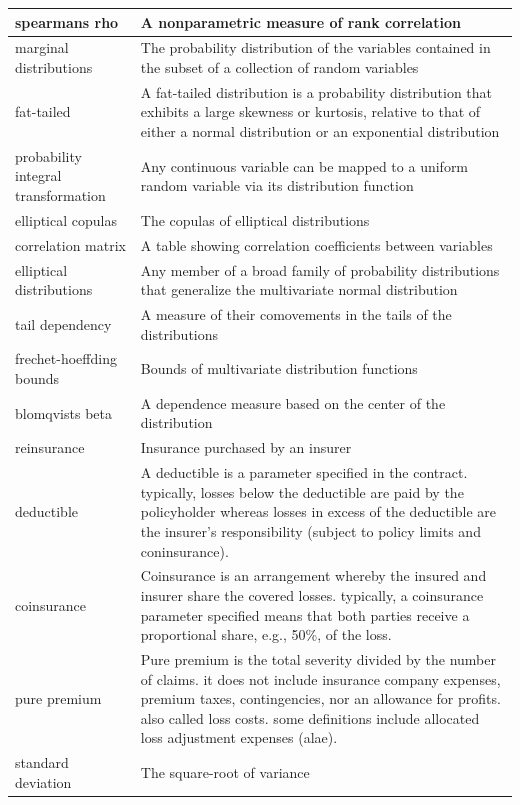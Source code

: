 \documentclass[
]{book}
\begin{document}
\begin{longtable}{>{\raggedright\arraybackslash}p{10em}|>{\raggedright\arraybackslash}p{30em}}
\hline
spearmans rho & A nonparametric measure of rank correlation\\
\hline
marginal distributions & The probability distribution of the variables contained in the subset of a collection of random variables\\
\hline
fat-tailed & A fat-tailed distribution is a probability distribution that exhibits a large skewness or kurtosis, relative to that of either a normal distribution or an exponential distribution\\
\hline
probability integral transformation & Any continuous variable can be mapped to a uniform random variable via its distribution function\\
\hline
elliptical copulas & The copulas of elliptical distributions\\
\hline
correlation matrix & A table showing correlation coefficients between variables\\
\hline
elliptical distributions & Any member of a broad family of probability distributions that generalize the multivariate normal distribution\\
\hline
tail dependency & A measure of their comovements in the tails of the distributions\\
\hline
frechet-hoeffding bounds & Bounds of multivariate distribution functions\\
\hline
blomqvists beta & A dependence measure based on the center of the distribution\\
\hline
reinsurance & Insurance purchased by an insurer\\
\hline
deductible & A deductible is a parameter specified in the contract. typically, losses below the deductible are paid by the policyholder whereas losses in excess of the deductible are the insurer's responsibility (subject to policy limits and coninsurance).\\
\hline
coinsurance & Coinsurance is an arrangement whereby the insured and insurer share the covered losses. typically, a coinsurance parameter specified means that both parties receive a proportional share, e.g., 50\%, of the loss.\\
\hline
pure premium & Pure premium is the total severity divided by the number of claims. it does not include insurance company expenses, premium taxes, contingencies, nor an allowance for profits. also called loss costs. some definitions include allocated loss adjustment expenses (alae).\\
\hline
standard deviation & The square-root of variance\\

\end{longtable}
\end{document}
